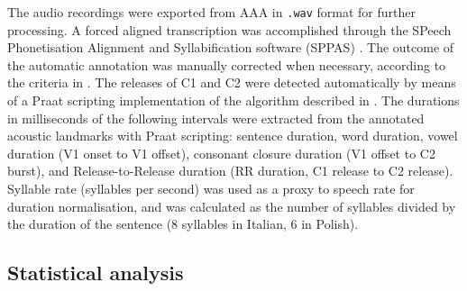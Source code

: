 \documentclass[]{JASAnew}
\begin{document}

The audio recordings were exported from AAA in \texttt{.wav} format for
further processing. A forced aligned transcription was accomplished
through the SPeech Phonetisation Alignment and Syllabification software
(SPPAS) \citep{bigi2015}. The outcome of the automatic annotation was
manually corrected when necessary, according to the criteria in
. The releases of C1 and C2 were detected
automatically by means of a Praat scripting implementation of the
algorithm described in \citet{ananthapadmanabha2014}. The durations in
milliseconds of the following intervals were extracted from the
annotated acoustic landmarks with Praat scripting: sentence duration,
word duration, vowel duration (V1 onset to V1 offset), consonant closure
duration (V1 offset to C2 burst), and Release-to-Release duration (RR
duration, C1 release to C2 release). Syllable rate (syllables per
second) was used as a proxy to speech rate \citep{plug2018} for duration
normalisation, and was calculated as the number of syllables divided by
the duration of the sentence (8 syllables in Italian, 6 in Polish).

\hypertarget{statistical-analysis}{%
\subsection{Statistical analysis}\label{statistical-analysis}}
\end{document}
